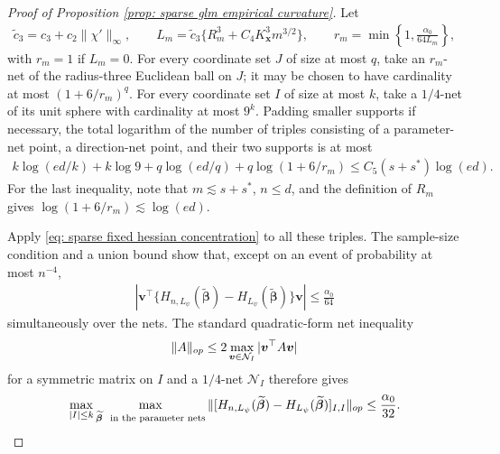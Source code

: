 \documentclass[letterpaper,12pt]{article}
\numberwithin{equation}{section}
\theoremstyle{plain}
\numberwithin{Theorem}{section}
\numberwithin{proposition}{section}
\numberwithin{Lemma}{section}
{
	\theoremstyle{definition}
	\newtheorem{Definition}{Definition}
	\newtheorem{example}{Example}
	\numberwithin{example}{section}
	\newtheorem{fact}{Fact}
	\numberwithin{fact}{section}
	\newtheorem{remark}{Remark}
}
\newcommand{\1}{\mathbbm{1}}
\def\bbeta{{\boldsymbol{\beta}}}
\begin{document}
\begin{proof}[Proof of Proposition \ref{prop: sparse glm empirical curvature}]
Let
\begin{align*}
\widetilde c_3=c_3+c_2\|\chi'\|_\infty,\qquad
L_m=\widetilde c_3\{R_m^3+C_4K_{\bm x}^3m^{3/2}\},\qquad
r_m=\min\left\{1,\frac{\alpha_0}{64L_m}\right\},
\end{align*}
with $r_m=1$ if $L_m=0$.  For every coordinate set $J$ of size at most
$q$, take an $r_m$-net of the radius-three Euclidean ball on $J$; it
may be chosen to have cardinality at most $(1+6/r_m)^q$.  For every
coordinate set $I$ of size at most $k$, take a $1/4$-net of its unit
sphere with cardinality at most $9^k$.  Padding smaller supports if
necessary, the total logarithm of the number of triples consisting of
a parameter-net point, a direction-net point, and their two supports
is at most
\begin{align}
k\log(ed/k)+k\log9
+q\log(ed/q)+q\log(1+6/r_m)
\leq C_5(s+s^*)\log(ed).                                    \label{eq: sparse hessian net entropy}
\end{align}
For the last inequality, note that $m\lesssim s+s^*$,
$n\leq d$, and the definition of $R_m$ gives
$\log(1+6/r_m)\lesssim\log(ed)$.

Apply \eqref{eq: sparse fixed hessian concentration} to all these
triples.  The sample-size condition and a union bound show that, except
on an event of probability at most $n^{-4}$,
\begin{align*}
\left|\bm v^\top\{H_{n,L_\psi}(\widetilde\bbeta)
-H_{L_\psi}(\widetilde\bbeta)\}\bm v\right|
\leq\frac{\alpha_0}{64}
\end{align*}
simultaneously over the nets.  The standard quadratic-form net
inequality
\begin{align*}
\|A\|_{\rm op}\leq2\max_{\bm v\in\mathcal N_I}
|\bm v^\top A\bm v|
\end{align*}
for a symmetric matrix on $I$ and a $1/4$-net $\mathcal N_I$ therefore
gives
\begin{align}
\max_{|I|\leq k}\max_{\widetilde\bbeta\ \text{ in the parameter nets}}
\|[H_{n,L_\psi}(\widetilde\bbeta)
-H_{L_\psi}(\widetilde\bbeta)]_{I,I}\|_{\rm op}
\leq\frac{\alpha_0}{32}.                                    \label{eq: sparse hessian bound on nets}
\end{align}


\end{proof}
\end{document}
